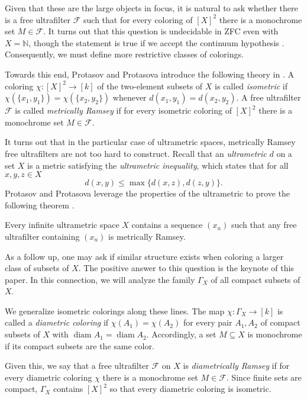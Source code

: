 Given that these are the large objects in focus, it is natural to ask whether there is a free ultrafilter \( \mathcal{F}  \) such that for every coloring of \( [X]^{2}  \) there is a monochrome set \( M \in \mathcal{F}  \). It turns out that this question is undecidable in ZFC even with \( X = \mathbb{N}  \), though the statement is true if we accept the continuum hypothesis \cite{protasov:2017}. Consequently, we must define more restrictive classes of colorings.

Towards this end, Protasov and Protasova introduce the following theory in \cite{protasov:2017}. A coloring \( \chi : [X]^{2} \to [k]  \) of the two-element subsets of \( X \) is called \emph{isometric} if \( \chi (\{ x_1, y_1 \} ) = \chi (\{ x_2, y_2 \} ) \) whenever \( d(x_1, y_1) = d(x_2, y_2) \). A free ultrafilter \( \mathcal{F}  \) is called \emph{metrically Ramsey} if for every isometric coloring of \( [X]^{2}  \) there is a monochrome set \( M \in \mathcal{F}  \).

It turns out that in the particular case of ultrametric spaces, metrically Ramsey free ultrafilters are not too hard to construct. Recall that an \emph{ultrametric} \( d \) on a set \( X \) is a metric satisfying the \emph{ultrametric inequality}, which states that for all \( x,y,z \in X \) \[ d(x,y) \leq \max \{ d(x,z), d(z,y) \}.  \] Protasov and Protasova leverage the properties of the ultrametric to prove the following theorem \cite{protasov:2017}.

\begin{theorem}
\label{thm:1}
Every infinite ultrametric space \( X \) contains a sequence \( (x_{n}) \) such that any free ultrafilter containing \( (x_{n}) \) is metrically Ramsey.
\end{theorem}

As a follow up, one may ask if similar structure exists when coloring a larger class of subsets of \( X \). The positive answer to this question is the keynote of this paper. In this connection, we will analyze the family \( \Gamma_{X}  \) of all compact subsets of \( X \).

We generalize isometric colorings along these lines. The map \( \chi : \Gamma_{X}  \to [k] \) is called a \emph{diametric coloring} if \( \chi (A_1) = \chi (A_2) \) for every pair \( A_1, A_2 \) of compact subsets of \( X \) with \( \operatorname{diam} A_1 = \operatorname{diam} A_2  \). Accordingly, a set \( M \subseteq X \) is monochrome if its compact subsets are the same color. 

Given this, we say that a free ultrafilter \( \mathcal{F}  \) on \( X \) is \emph{diametrically Ramsey} if for every diametric coloring \( \chi \) there is a monochrome set \( M  \in \mathcal{F}  \). Since finite sets are compact, \( \Gamma_{X}  \) contains \( [X]^{2}  \) so that every diametric coloring is isometric.


